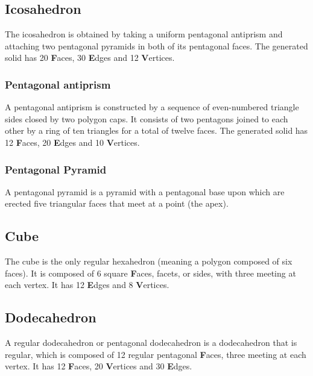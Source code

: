 
\subsection{Icosahedron}
The icosahedron is obtained by taking a uniform pentagonal antiprism and attaching two pentagonal pyramids in both of its pentagonal faces. The generated solid has 20 \textbf{F}aces, 30 \textbf{E}dges and 12 \textbf{V}ertices.\par

\subsubsection{Pentagonal antiprism}
A pentagonal antiprism is constructed by a sequence of even-numbered triangle sides closed by two polygon caps. It consists of two pentagons joined to each other by a ring of ten triangles for a total of twelve faces. The generated solid has 12 \textbf{F}aces, 20 \textbf{E}dges and 10 \textbf{V}ertices.

\subsubsection{Pentagonal Pyramid}
A pentagonal pyramid is a pyramid with a pentagonal base upon which are erected five triangular faces that meet at a point (the apex).


\subsection{Cube}
The cube is the only regular hexahedron (meaning a polygon composed of six faces). It is composed of 6 square \textbf{F}aces, facets, or sides, with three meeting at each vertex. It has 12 \textbf{E}dges and 8 \textbf{V}ertices.


\subsection{Dodecahedron}
A regular dodecahedron or pentagonal dodecahedron is a dodecahedron that is regular, which is composed of 12 regular pentagonal \textbf{F}aces, three meeting at each vertex. It has 12 \textbf{F}aces, 20 \textbf{V}ertices and 30 \textbf{E}dges.


